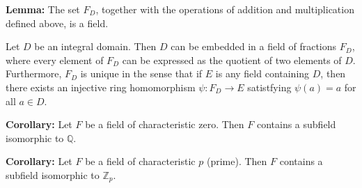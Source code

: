 \documentclass{article}
\newcommand{\Z}{\mathbb{Z}}
\newcommand{\Q}{\mathbb{Q}}
\begin{document}
\textbf{Lemma:} The set $F_D$, together with the operations of addition and multiplication defined above, is a field.

\begin{theorem}
  Let $D$ be an integral domain. Then $D$ can be embedded in a field of fractions $F_D$, where every element of $F_D$ can be expressed as the quotient of two elements of $D$. Furthermore, $F_D$ is unique in the sense that if $E$ is any field containing $D$, then there exists an injective ring homomorphism $\psi:F_D\to E$ satistfying $\psi(a)=a$ for all $a\in D$.
\end{theorem}

\textbf{Corollary:} Let $F$ be a field of characteristic zero. Then $F$ contains a subfield isomorphic to $\Q$.

\textbf{Corollary:} Let $F$ be a field of characteristic $p$ (prime). Then $F$ contains a subfield isomorphic to $\Z_p$. 
\end{document}

